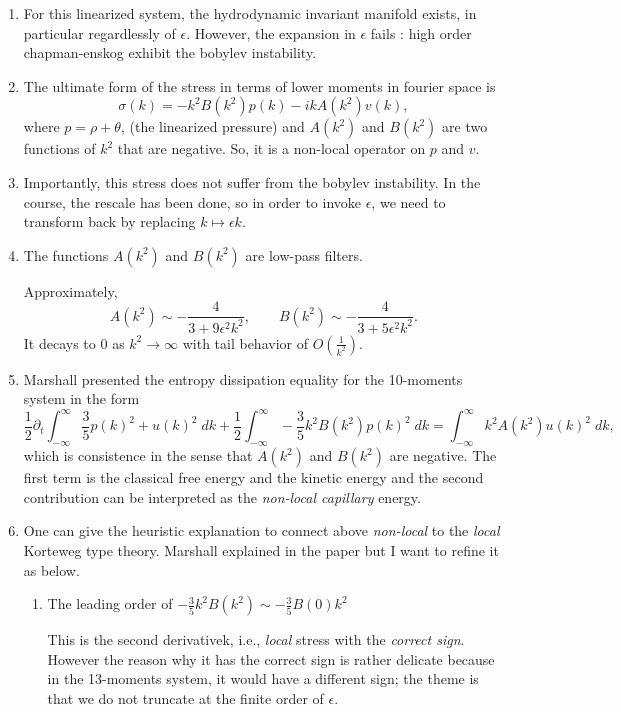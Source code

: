 \documentclass[a4paper,12pt]{article}
\begin{document}
\begin{enumerate}
 \item For this linearized system, the hydrodynamic invariant manifold exists, in particular regardlessly of $\epsilon$. However, the expansion in $\epsilon$ fails : high order chapman-enskog exhibit the bobylev instability.
 
 \item The ultimate form of the stress in terms of lower moments in fourier space is
 $$\sigma(k) = - k^2 B(k^2) p(k) - i k A(k^2)v(k),$$
 where $p = \rho + \theta$, (the linearized pressure) and {{{$A(k^2)$}}} and {{{$B(k^2)$}}} are two functions of {{{$k^2$}}} that are negative. So, it is a non-local operator on $p$ and $v$. 
 \item Importantly, this stress does not suffer from the bobylev instability. In the course, the rescale has been done, so in order to invoke $\epsilon$, we need to transform back by replacing $k \mapsto \epsilon k$. 
 \item The functions $A(k^2)$ and $B(k^2)$ are low-pass filters. 
%  

Approximately,
{{{ $$ A(k^2) \sim -\frac{4}{3 + 9\epsilon^2 k^2}, \qquad B(k^2) \sim -\frac{4}{3 + 5\epsilon^2 k^2}. $$ }}}
It decays to $0$ as $k^2 \rightarrow \infty$ with tail behavior of $O(\frac{1}{k^2})$.

 \item Marshall presented the entropy dissipation equality for the 10-moments system in the form
$$ \frac{1}{2} \partial_t \int_{-\infty}^{\infty} \frac{3}{5} p(k)^2 + u(k)^2 \; dk + \frac{1}{2} \int_{-\infty}^{\infty} -\frac{3}{5}k^2 B(k^2)p(k)^2 \; dk = \int_{-\infty}^{\infty} k^2 A(k^2) u(k)^2 \; dk, $$
which is consistence in the sense that $A(k^2)$ and $B(k^2)$ are negative. The first term is the classical free energy and the kinetic energy and the second contribution can be interpreted as the {\it non-local capillary} energy.

 \item One can give the heuristic explanation to connect above {\it non-local} to the {\it local} Korteweg type theory. Marshall explained in the paper but I want to refine it as below.  
 \begin{enumerate}
 \item The leading order of $-\frac{3}{5}k^2 B(k^2) \sim -\frac{3}{5}B(0) k^2$
 
 This is the second derivativek, i.e., {\it local} stress with the {\it correct sign}. However the reason why it has the correct sign is rather delicate because in the 13-moments system, it would have a different sign; the theme is that we do not truncate at the finite order of $\epsilon$.
 

\end{enumerate}
\end{enumerate}
\end{document}
